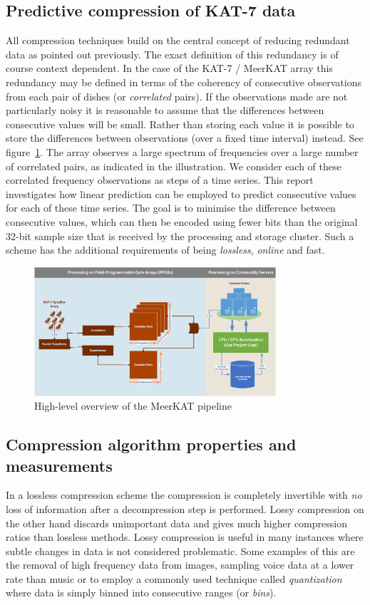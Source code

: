 \subsection{Predictive compression of KAT-7 data}
All compression techniques build on the central concept of reducing redundant data as pointed out previously. The exact definition of this redundancy is of course context 
dependent. In the case of the KAT-7 / MeerKAT array this redundancy may be defined in terms of the coherency of consecutive observations from each pair of dishes 
(or \textit{correlated} pairs). If the observations made are not particularly noisy it is reasonable to assume that the differences between consecutive values will be small.
Rather than storing each value it is possible to store the differences between observations (over a fixed time interval) instead. See figure~\ref{MeerKAT_PIPELINE}. 
The array observes a large spectrum of frequencies over a large number of correlated pairs, as indicated in the illustration. We consider each of these correlated frequency 
observations as steps of a time series. This report investigates how linear prediction can be employed to predict consecutive values for each of these time series. The goal is
to minimise the difference between consecutive values, which can then be encoded using fewer bits than the original 32-bit sample size that is received by the processing and 
storage cluster. Such a scheme has the additional requirements of being \textit{lossless}, \textit{online} and fast.

\begin{figure}[h!]
 \centering
 \includegraphics[width=0.8\textwidth]{Process.png}
 \caption{High-level overview of the MeerKAT pipeline}
 \label{MeerKAT_PIPELINE}
\end{figure}
\subsection{Compression algorithm properties and measurements}
In a lossless compression scheme the compression is completely invertible with \textit{no} loss of information after a decompression step is performed. Lossy
compression on the other hand discards unimportant data and gives much higher compression ratios than lossless methods. Lossy compression is useful in many
instances where subtle changes in data is not considered problematic. Some examples of this are the removal of high frequency data from images, sampling 
voice data at a lower rate than music or to employ a commonly used technique called \textit{quantization} where data is simply binned into consecutive ranges 
(or \textit{bins}).

